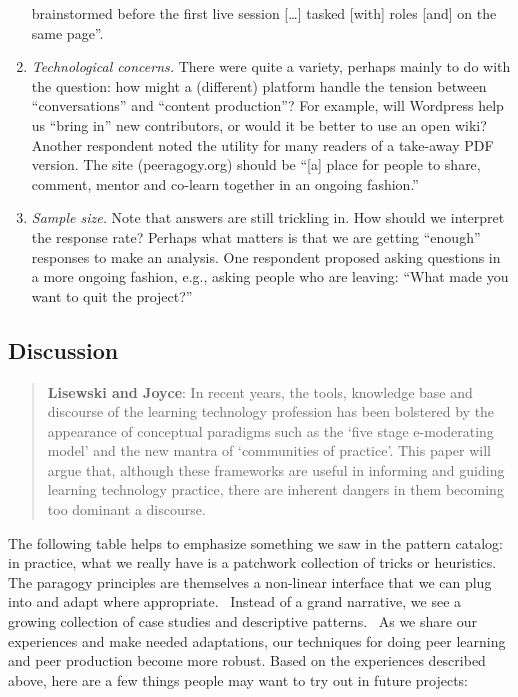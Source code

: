 \begin{enumerate}
  brainstormed before the first live session {[}\ldots{}{]} tasked
  {[}with{]} roles {[}and{]} on the same page''.
\item
  \emph{Technological concerns.} There were quite a variety, perhaps
  mainly to do with the question: how might a (different) platform
  handle the tension between ``conversations'' and ``content
  production''? For example, will Wordpress help us ``bring in'' new
  contributors, or would it be better to use an open wiki? Another
  respondent noted the utility for many readers of a take-away PDF
  version. The site (peeragogy.org) should be ``{[}a{]} place for people
  to share, comment, mentor and co-learn together in an ongoing
  fashion.''
\item
  \emph{Sample size.} Note that answers are still trickling in. How
  should we interpret the response rate? Perhaps what matters is that we
  are getting ``enough'' responses to make an analysis. One respondent
  proposed asking questions in a more ongoing fashion, e.g., asking
  people who are leaving: ``What made you want to quit the project?''
\end{enumerate}

\subsection{Discussion}

\begin{quote}
\textbf{Lisewski and Joyce}: In recent years, the tools, knowledge base
and discourse of the learning technology profession has been bolstered
by the appearance of conceptual paradigms such as the `five stage
e-moderating model' and the new mantra of `communities of practice'.
This paper will argue that, although these frameworks are useful in
informing and guiding learning technology practice, there are inherent
dangers in them becoming too dominant a discourse.
\end{quote}

The following table helps to emphasize something we saw in the pattern
catalog: in practice, what we really have is a patchwork collection of
tricks or heuristics.~ The paragogy principles are themselves a
non-linear interface that we can plug into and adapt where appropriate.~
Instead of a grand narrative, we see a growing collection of case
studies and descriptive patterns.~ As we share our experiences and make
needed adaptations, our techniques for doing peer learning and peer
production become more robust. Based on the experiences described above,
here are a few things people may want to try out in future projects:

